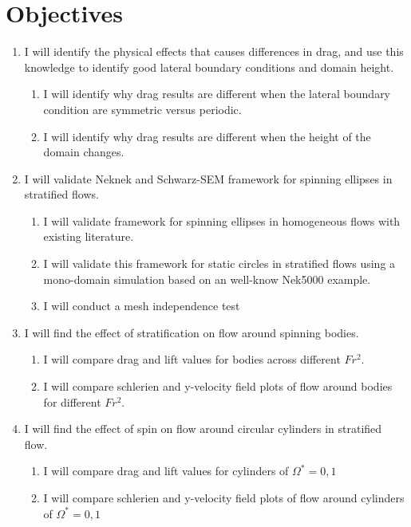 %
%
%
%

\chapter{Objectives}
\label{chp:Objectives}

\begin{enumerate}
	\item I will identify the physical effects that causes differences in drag, and use this knowledge to identify good lateral boundary conditions and domain height.
	\begin{enumerate}
		\item I will identify why drag results are different when the lateral boundary condition are symmetric versus periodic. 
		\item I will identify why drag results are different when the height of the domain changes. 
	\end{enumerate}
	\item I will validate Neknek and Schwarz-SEM framework for spinning ellipses in stratified flows.
	\begin{enumerate}
		\item I will validate framework for spinning ellipses in homogeneous flows with existing literature.
		\item I will validate this framework for static circles in stratified flows using a mono-domain simulation based on an well-know Nek5000 example.  		
		\item I will conduct a mesh independence test 
	\end{enumerate}
	\item I will find the effect of stratification on flow around spinning bodies.
	\begin{enumerate}
		\item I will compare drag and lift values for bodies across different $Fr^2$.
		\item I will compare schlerien and y-velocity field plots of flow around bodies for different $Fr^2$.
	\end{enumerate}
	\item I will find the effect of spin on flow around circular cylinders in stratified flow.
	\begin{enumerate}
		\item I will compare drag and lift values for cylinders of $\Omega^{\ast} = 0, 1$ 
		\item I will compare schlerien and y-velocity field plots of flow around cylinders of $\Omega^{\ast} = 0, 1$ 
	\end{enumerate}
\end{enumerate}
